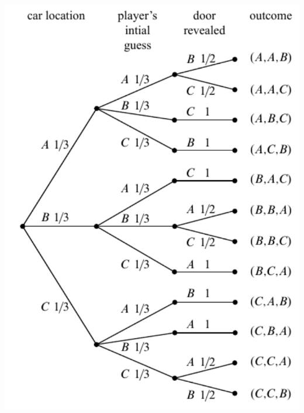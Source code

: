 \begin{frame}
      \begin{block}{}
        \begin{center}
          \includegraphics[scale=0.5]{fig175b.pdf}
        \end{center}
      \end{block}
\end{frame}

